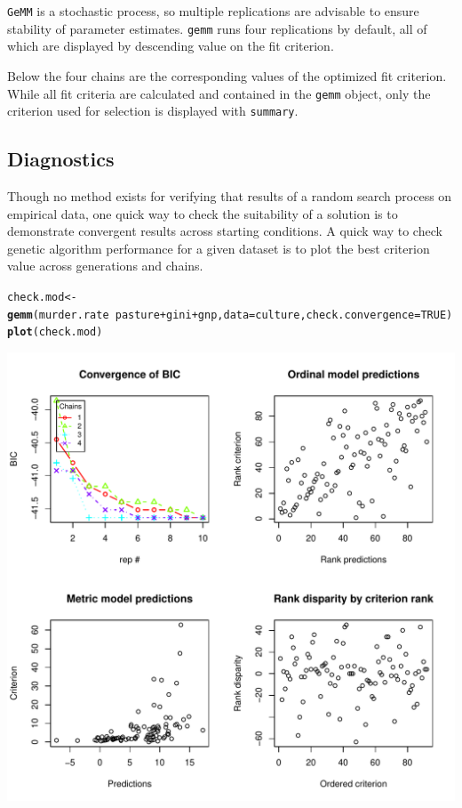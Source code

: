 \documentclass{article}\usepackage[]{graphicx}\usepackage[]{color}
\makeatletter
\def\maxwidth{ %
  \ifdim\Gin@nat@width>\linewidth
    \linewidth
  \else
    \Gin@nat@width
  \fi
}
\newcommand{\hlnum}[1]{\textcolor[rgb]{0.686,0.059,0.569}{#1}}%
\newcommand{\hlopt}[1]{\textcolor[rgb]{0,0,0}{#1}}%
\newcommand{\hlstd}[1]{\textcolor[rgb]{0.345,0.345,0.345}{#1}}%
\newcommand{\hlkwb}[1]{\textcolor[rgb]{0.69,0.353,0.396}{#1}}%
\newcommand{\hlkwc}[1]{\textcolor[rgb]{0.333,0.667,0.333}{#1}}%
\newcommand{\hlkwd}[1]{\textcolor[rgb]{0.737,0.353,0.396}{\textbf{#1}}}%
\newenvironment{kframe}{%
 \def\at@end@of@kframe{}%
 \ifinner\ifhmode%
  \def\at@end@of@kframe{\end{minipage}}%
  \begin{minipage}{\columnwidth}%
 \fi\fi%
 \def\FrameCommand##1{\hskip\@totalleftmargin \hskip-\fboxsep
 \colorbox{shadecolor}{##1}\hskip-\fboxsep
     \hskip-\linewidth \hskip-\@totalleftmargin \hskip\columnwidth}%
 \MakeFramed {\advance\hsize-\width
   \@totalleftmargin\z@ \linewidth\hsize
   \@setminipage}}%
 {\par\unskip\endMakeFramed%
 \at@end@of@kframe}
\newenvironment{knitrout}{}{} %
\makeatother
\begin{document}
\texttt{GeMM} is a stochastic process, so multiple replications are advisable to ensure stability of parameter estimates.
\texttt{gemm} runs four replications by default, all of which are displayed by descending value on the fit criterion.

Below the four chains are the corresponding values of the optimized fit criterion.
While all fit criteria are calculated and contained in the \texttt{gemm} object, only the criterion used for selection is displayed with \texttt{summary}.

\subsection*{Diagnostics}

Though no method exists for verifying that results of a random search process on empirical data, one quick way to check the suitability of a solution is to demonstrate convergent results across starting conditions.
A quick way to check genetic algorithm performance for a given dataset is to plot the best criterion value across generations and chains.

\begin{knitrout}
\color{fgcolor}\begin{kframe}
\begin{alltt}
\hlstd{check.mod} \hlkwb{<-} \hlkwd{gemm}\hlstd{(murder.rate} \hlopt{~} \hlstd{pasture} \hlopt{+} \hlstd{gini} \hlopt{+} \hlstd{gnp,} \hlkwc{data} \hlstd{= culture,} \hlkwc{check.convergence} \hlstd{=} \hlnum{TRUE}\hlstd{)}
\hlkwd{plot}\hlstd{(check.mod)}
\end{alltt}
\end{kframe}
\includegraphics[width=\maxwidth]{figure/plotting} 

\end{knitrout}
\end{document}

